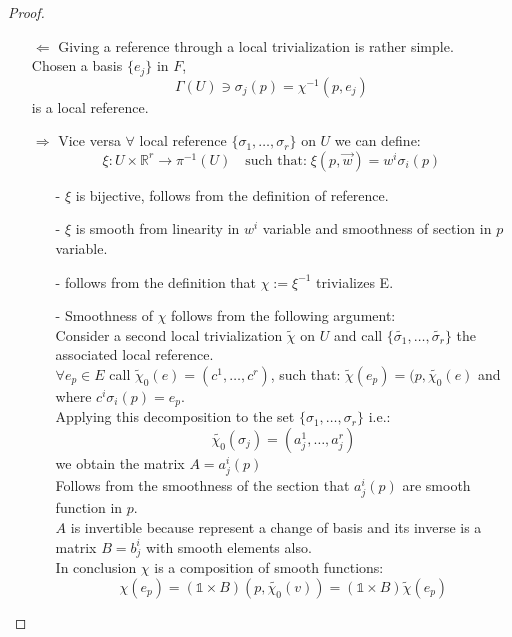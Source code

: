 \documentclass[a4paper,12pt]{scrartcl}    %
\begin{document}
\begin{proof}
\begin{itemize}
\item[$\Leftarrow$] Giving a reference through a local trivialization is rather simple.
	\\ Chosen a basis $\{ e_j \}$ in $F$,
	\begin{displaymath}
		\Gamma(U) \ni \sigma_j (p) = \chi^{-1}(p, e_j)
	\end{displaymath}	 
	is a local reference.

\item[$\Rightarrow$]
	Vice versa $\forall $ local reference $\{ \sigma_1, \ldots, \sigma_r \} $ on $U$ we can define:
	\begin{displaymath}
	\xi: U \times \mathbb{R}^r \rightarrow \pi^{-1}(U) \quad \textrm{such that:} \; \xi(p,\vec{w}) = w^i \sigma_i(p) 
	\end{displaymath}
	\begin{itemize}
	\item[-] $\xi$ is bijective, follows from the definition of reference.
	\item[-] $\xi$ is smooth from linearity in $w^i$ variable and smoothness of section in $p$ variable. 
	\item[-] follows from the definition that $\chi := \xi^{-1}$ trivializes E.
	\item[-] Smoothness of $\chi$ follows from the following argument:
		\\ Consider a second local trivialization $\tilde{\chi}$ on $U$ and call $\{ \tilde{\sigma_1}, \ldots, \tilde{\sigma_r} \} $ the associated local reference.	
		\\ $\forall e_p \in E $ call $\tilde{\chi}_0 (e) = ( c^1 , \ldots, c^r)$, such that: $\tilde{\chi}(e_p) = ( p, \tilde{\chi_0}(e) $ and where $c^i \sigma_i (p) = e_p $.
		\\ Applying this decomposition to the set $\{ \sigma_1, \ldots, \sigma_r \} $ i.e.: 
		\begin{displaymath}
			\tilde{\chi_0}(\sigma_j)= ( a_j^1, \ldots, a_j^r)
		\end{displaymath}
		we obtain the matrix $A= a^i_j(p)$
		\\ Follows from the smoothness of the section that $a^i_j(p)$ are smooth function in $p$.
		\\ $A$ is invertible because represent a change of basis and its inverse is a matrix $B = b^i_j$ with smooth elements also.
		\\ In conclusion $\chi$ is a composition of smooth functions:
		\begin{displaymath}
		 \chi (e_p) = ( \mathds{1} \times B) ( p, \tilde{\chi_0}(v) ) = (\mathds{1} \times B ) \tilde{\chi}(e_p)
		\end{displaymath}
	\end{itemize}
\end{itemize}
\end{proof}
\end{document}
